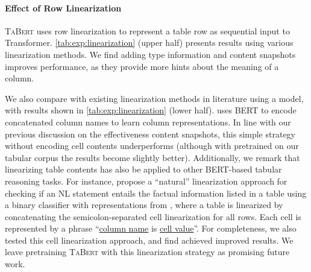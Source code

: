 \documentclass[11pt,a4paper]{article}
\def\model/{\textsc{TaBert}}
\def\modelbase/{}
\def\bert/{}
\def\bertbase/{}
\renewcommand{\tt}[1]{\fontfamily{cmtt}\selectfont #1}
\begin{document}
\paragraph{Effect of Row Linearization}  
\model/ uses row linearization to represent a table row as sequential input to Transformer. 
\autoref{tab:exp:linearization} (upper half) presents results using various linearization methods.
We find adding type information and content snapshots improves performance, as they provide more hints about the meaning of a column.

We also compare with existing linearization methods in literature using a \modelbase/ model, with results shown in \autoref{tab:exp:linearization} (lower half). 
\citet{Hwang2019ACE} uses BERT to encode concatenated column names to learn column representations.
In line with our previous discussion on the effectiveness content snapshots,
this simple strategy without encoding cell contents underperforms 
(although with \modelbase/ pretrained on our tabular corpus the results become slightly better).
Additionally, we remark that linearizing table contents has also be applied to other BERT-based tabular reasoning tasks.
For instance, \citet{Chen2019TabFactAL} propose a ``natural'' linearization approach for checking if an NL statement entails the factual information listed in a table using a binary classifier with representations from \bert/, where a table is linearized by concatenating the semicolon-separated cell linearization for all rows. Each cell is represented by a phrase ``{\tt \underline{column name} is \underline{cell value}}''.
For completeness, we also tested this cell linearization approach,
and find \bertbase/ achieved improved results.
We leave pretraining \model/ with this linearization strategy as promising future work.
\end{document}
